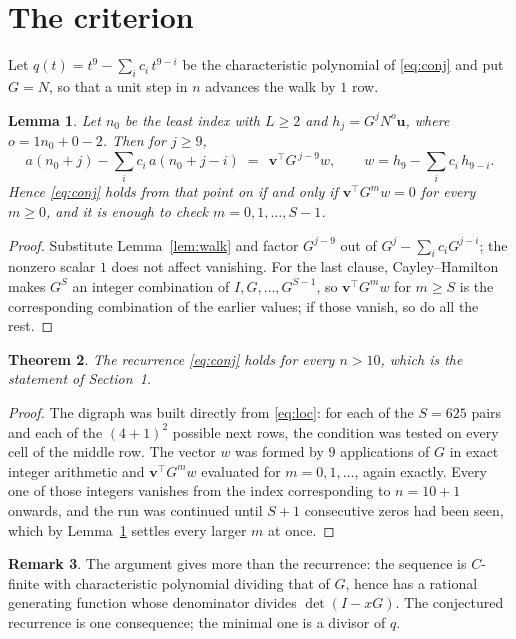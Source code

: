 \documentclass[11pt,a4paper]{article}
\theoremstyle{plain}
\newtheorem{theorem}{Theorem}
\newtheorem{lemma}[theorem]{Lemma}
\theoremstyle{definition}
\newtheorem{remark}[theorem]{Remark}
\begin{document}
\section{The criterion}

Let $q(t)=t^{9}-\sum_i c_i\,t^{9-i}$ be the characteristic polynomial of
\eqref{eq:conj} and put $G=N$, so that a unit step in $n$ advances the walk by
$1$ row.

\begin{lemma}\label{lem:crit}
Let $n_0$ be the least index with $L\ge2$ and $h_j=G^{j}N^{o}\mathbf{u}$, where
$o=1n_0+0-2$. Then for $j\ge9$,
\[
a(n_0+j)-\sum_i c_i\,a(n_0+j-i)\;=\;\,\mathbf{v}^{\!\top}G^{\,j-9}w,
\qquad w=h_{9}-\sum_i c_i\,h_{9-i} .
\]
Hence \eqref{eq:conj} holds from that point on if and only if
$\mathbf{v}^{\!\top}G^{m}w=0$ for every $m\ge0$, and it is enough to check
$m=0,1,\dots,S-1$.
\end{lemma}

\begin{proof}
Substitute Lemma~\ref{lem:walk} and factor $G^{j-9}$ out of
$G^{j}-\sum_ic_iG^{j-i}$; the nonzero scalar $1$ does not affect
vanishing. For the last clause, Cayley--Hamilton makes $G^{S}$ an integer combination of
$I,G,\dots,G^{S-1}$, so $\mathbf{v}^{\!\top}G^{m}w$ for $m\ge S$ is the corresponding
combination of the earlier values; if those vanish, so do all the rest.
\end{proof}

\begin{theorem}
The recurrence \eqref{eq:conj} holds for every $n>10$, which is the statement of
Section~1.
\end{theorem}

\begin{proof}
The digraph was built directly from \eqref{eq:loc}: for each of the $S=625$ pairs and each
of the $(4+1)^{2}$ possible next rows, the condition was tested on every cell of
the middle row. The vector $w$ was formed by $9$ applications of $G$ in exact integer
arithmetic and $\mathbf{v}^{\!\top}G^{m}w$ evaluated for $m=0,1,\dots$, again exactly.
Every one of those integers vanishes from the index corresponding to $n=10+1$ onwards,
and the run was continued until $S+1$ consecutive zeros had been seen, which by
Lemma~\ref{lem:crit} settles every larger $m$ at once.
\end{proof}

\begin{remark}
The argument gives more than the recurrence: the sequence is $C$-finite with characteristic
polynomial dividing that of $G$, hence has a rational generating function whose denominator
divides $\det(I-xG)$. The conjectured recurrence is one consequence; the minimal one is a
divisor of $q$.
\end{remark}
\end{document}
